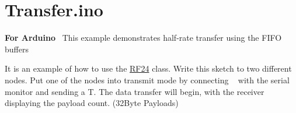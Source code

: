 \hypertarget{Transfer_8ino-example}{}\section{Transfer.\+ino}
{\bfseries For Arduino}~\newline
 This example demonstrates half-\/rate transfer using the F\+I\+FO buffers~\newline


It is an example of how to use the \hyperlink{classRF24}{R\+F24} class. Write this sketch to two different nodes. Put one of the nodes into \textquotesingle{}transmit\textquotesingle{} mode by connecting ~\newline
 with the serial monitor and sending a \textquotesingle{}T\textquotesingle{}. The data transfer will begin, with the receiver displaying the payload count. (32\+Byte Payloads) ~\newline



